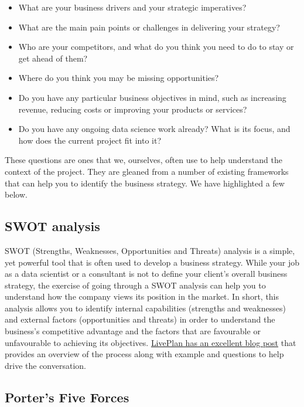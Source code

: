 \documentclass[
]{book}
\providecommand{\tightlist}{%
  \setlength{\itemsep}{0pt}\setlength{\parskip}{0pt}}
\begin{document}
\begin{itemize}
\tightlist
\item
  What are your business drivers and your strategic imperatives?
\item
  What are the main pain points or challenges in delivering your
  strategy?
\item
  Who are your competitors, and what do you think you need to do to stay
  or get ahead of them?
\item
  Where do you think you may be missing opportunities?
\item
  Do you have any particular business objectives in mind, such as
  increasing revenue, reducing costs or improving your products or
  services?
\item
  Do you have any ongoing data science work already? What is its focus,
  and how does the current project fit into it?
\end{itemize}

These questions are ones that we, ourselves, often use to help
understand the context of the project. They are gleaned from a number of
existing frameworks that can help you to identify the business strategy.
We have highlighted a few below.

\hypertarget{swot-analysis}{%
\subsection{SWOT analysis}\label{swot-analysis}}

SWOT (Strengths, Weaknesses, Opportunities and Threats) analysis is a
simple, yet powerful tool that is often used to develop a business
strategy. While your job as a data scientist or a consultant is not to
define your client's overall business strategy, the exercise of going
through a SWOT analysis can help you to understand how the company views
its position in the market. In short, this analysis allows you to
identify internal capabilities (strengths and weaknesses) and external
factors (opportunities and threats) in order to understand the
business's competitive advantage and the factors that are favourable or
unfavourable to achieving its objectives.
\href{https://www.liveplan.com/blog/what-is-a-swot-analysis-and-how-to-do-it-right-with-examples/}{LivePlan
has an excellent blog post} that provides an overview of the process
along with example and questions to help drive the conversation.

\hypertarget{porters-five-forces}{%
\subsection{Porter's Five Forces}\label{porters-five-forces}}
\end{document}
